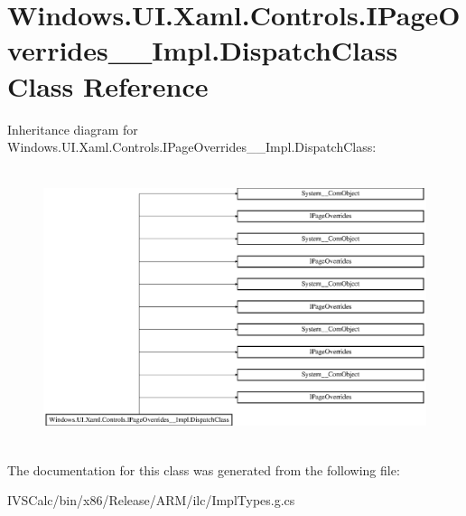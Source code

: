 \hypertarget{class_windows_1_1_u_i_1_1_xaml_1_1_controls_1_1_i_page_overrides_____impl_1_1_dispatch_class}{}\section{Windows.\+U\+I.\+Xaml.\+Controls.\+I\+Page\+Overrides\+\_\+\+\_\+\+Impl.\+Dispatch\+Class Class Reference}
\label{class_windows_1_1_u_i_1_1_xaml_1_1_controls_1_1_i_page_overrides_____impl_1_1_dispatch_class}
Inheritance diagram for Windows.\+U\+I.\+Xaml.\+Controls.\+I\+Page\+Overrides\+\_\+\+\_\+\+Impl.\+Dispatch\+Class\+:\begin{figure}[H]
\begin{center}
\leavevmode
\includegraphics[height=8.083990cm]{class_windows_1_1_u_i_1_1_xaml_1_1_controls_1_1_i_page_overrides_____impl_1_1_dispatch_class}
\end{center}
\end{figure}


The documentation for this class was generated from the following file\+:\begin{DoxyCompactItemize}
\item 
I\+V\+S\+Calc/bin/x86/\+Release/\+A\+R\+M/ilc/Impl\+Types.\+g.\+cs\end{DoxyCompactItemize}
